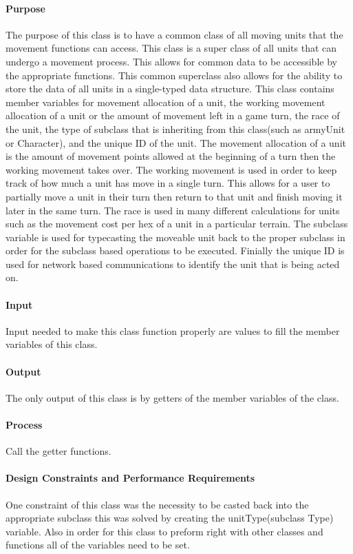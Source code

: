 \documentclass[12pt,a4paper]{article}
\begin{document}
\paragraph{Purpose} The purpose of this class is to have a common class of all moving units that the movement functions can access. This class is a super class of all units that can undergo a movement process. This allows for common data to be accessible by the appropriate functions. This common superclass also allows for the ability to store the data of all units in a single-typed data structure. This class contains member variables for movement allocation of a unit, the working movement allocation of a unit or the amount of movement left in a game turn, the race of the unit, the type of subclass that is inheriting from this class(such as armyUnit or Character), and the unique ID of the unit. The movement allocation of a unit is the amount of movement points allowed at the beginning of a turn then the working movement takes over. The working movement is used in order to keep track of how much a unit has move in a single turn. This allows for a user to partially move a unit in their turn then return to that unit and finish moving it later in the same turn. The race is used in many different calculations for units such as the movement cost per hex of a unit in a particular terrain. The subclass variable is used for typecasting the moveable unit back to the proper subclass in order for the subclass based operations to be executed. Finially the unique ID is used for network based communications to identify the unit that is being acted on. 
\paragraph{Input} Input needed to make this class function properly are values to fill the member variables of this class. 
\paragraph{Output} The only output of this class is by getters of the member variables of the class. 
\paragraph{Process} Call the getter functions.
\paragraph{Design Constraints and Performance Requirements} One constraint of this class was the necessity to be casted back into the appropriate subclass this was solved by creating the unitType(subclass Type) variable. Also in order for this class to preform right with other classes and functions all of the variables need to be set. 
	
\end{document}
